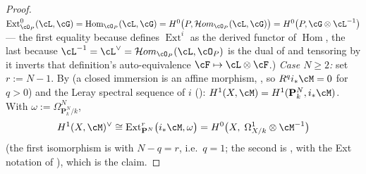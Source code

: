 \begin{proof}
$\operatorname{Ext}^0_{\cO_P}(\cL,\cG)=\operatorname{Hom}_{\cO_P}(\cL,\cG)
=H^0\bigl(P,\mathcal{H}om_{\cO_P}(\cL,\cG)\bigr)
=H^0\bigl(P,\cG\otimes\cL^{-1}\bigr)$ --- the first equality because
 defines $\operatorname{Ext}^i$ as the derived functor
of $\operatorname{Hom}$, the last because
$\cL^{-1}=\cL^{\vee}=\mathcal{H}om_{\cO_P}(\cL,\cO_P)$ is the dual of
 and tensoring by it inverts that
definition's auto-equivalence $\cF\mapsto\cL\otimes\cF$.)
\emph{Case $N\ge2$:} set $r:=N-1$.  By
 (a closed immersion is an affine
morphism, , so
$R^qi_*\cM=0$ for $q>0$) and the Leray spectral sequence of $i$
():
$H^1(X,\cM)=H^1(\mathbf P^N_k,i_*\cM)$.  With
$\omega:=\Omega^N_{\mathbf P^N_k/k}$,
\[
H^1(X,\cM)^{\vee}
\cong\operatorname{Ext}^{r}_{\mathbf P^N}\bigl(i_*\cM,\omega\bigr)
=H^0\bigl(X,\;\Omega^1_{X/k}\otimes\cM^{-1}\bigr)
\]
(the first isomorphism is  with
$N-q=r$, i.e.\ $q=1$; the second is
, with the Ext notation of
), which is the claim.
\end{proof}

